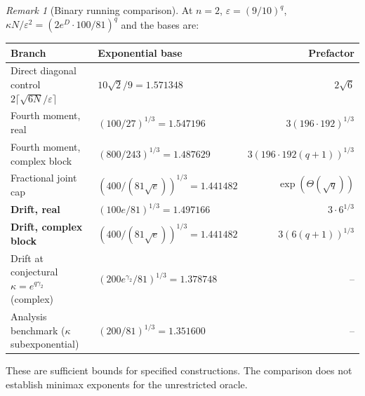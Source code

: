 \documentclass[11pt,a4paper]{article}
\theoremstyle{definition}\newtheorem{definition}[theorem]{Definition}
\theoremstyle{remark}\newtheorem{remark}[theorem]{Remark}
\numberwithin{equation}{section}
\newcommand{\eps}{\varepsilon}
\begin{document}
\begin{remark}[Binary running comparison]\label{rem:binary}
At $n=2$, $\eps=(9/10)^q$, $\kappa N/\eps^2=(2e^{D}\cdot100/81)^q$ and the bases are:
\begin{center}
\renewcommand{\arraystretch}{1.15}
\begin{tabular}{@{}llr@{}}
\toprule
Branch & Exponential base & Prefactor\\
\midrule
Direct diagonal control $2\lceil\sqrt{6N}/\eps\rceil$ & $10\sqrt2/9=1.571348$ & $2\sqrt6$\\
Fourth moment, real & $(100/27)^{1/3}=1.547196$ & $3(196\cdot192)^{1/3}$\\
Fourth moment, complex block & $(800/243)^{1/3}=1.487629$ & $3(196\cdot192(q+1))^{1/3}$\\
Fractional joint cap & $(400/(81\sqrt e))^{1/3}=1.441482$ & $\exp(\Theta(\sqrt q))$\\
\textbf{Drift, real} & $(100e/81)^{1/3}=1.497166$ & $3\cdot6^{1/3}$\\
\textbf{Drift, complex block} & $(400/(81\sqrt e))^{1/3}=1.441482$ & $3(6(q+1))^{1/3}$\\
Drift at conjectural $\kappa=e^{q\gamma_2}$ (complex) & $(200e^{\gamma_2}/81)^{1/3}=1.378748$ & --\\
Analysis benchmark ($\kappa$ subexponential) & $(200/81)^{1/3}=1.351600$ & --\\
\bottomrule
\end{tabular}
\end{center}
These are sufficient bounds for specified constructions. The comparison does
not establish minimax exponents for the unrestricted oracle.
\end{remark}
\end{document}

